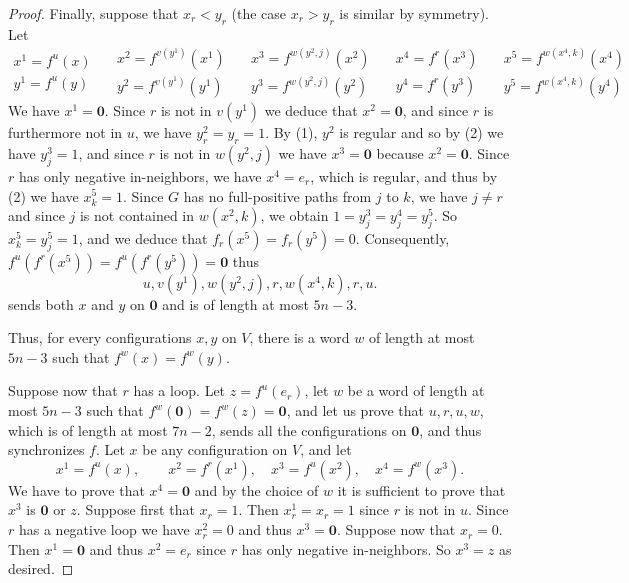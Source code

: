 \documentclass[11pt,letter]{article}
\newcommand{\ZERO}{{\mathbf{0}}}
\begin{document}
\begin{proof}
\medskip
Finally, suppose that $x_{r}<y_{r}$ (the case $x_{r}>y_{r}$ is similar by symmetry). Let 
\[
\begin{array}{l}
x^1=f^u(x)\\
y^1=f^u(y)
\end{array}
\quad
\begin{array}{l}
x^2=f^{v(y^1)}(x^1)\\
y^2=f^{v(y^1)}(y^1)
\end{array}
\quad
\begin{array}{l}
x^3=f^{w(y^2,j)}(x^2)\\
y^3=f^{w(y^2,j)}(y^2)
\end{array}
\quad
\begin{array}{l}
x^4=f^{r}(x^3)\\
y^4=f^{r}(y^3)
\end{array}
\quad
\begin{array}{l}
x^5=f^{w(x^4,k)}(x^4)\\
y^5=f^{w(x^4,k)}(y^4)
\end{array}
\]
We have $x^1=\ZERO$. Since $r$ is not in $v(y^1)$ we deduce that $x^2=\ZERO$, and since $r$ is furthermore not in $u$, we have $y^2_{r}=y_{r}=1$. By (1), $y^2$ is regular and so by (2) we have $y^3_j=1$, and since $r$ is not in $w(y^2,j)$ we have $x^3=\ZERO$ because $x^2=\ZERO$. Since $r$ has only negative in-neighbors, we have $x^4=e_{r}$, which is regular, and thus by (2) we have $x^5_k=1$. Since $G$ has no full-positive paths from $j$ to $k$, we have $j\neq r$ and since $j$ is not contained in $w(x^2,k)$, we obtain $1=y^3_j=y^4_j=y^5_j$. So $x^5_k=y^5_j=1$, and we deduce that $f_{r}(x^5)=f_{r}(y^5)=0$. Consequently, $f^u(f^{r}(x^5))=f^u(f^{r}(y^5))=\ZERO$ thus 
\[
u,v(y^1),w(y^2,j),r,w(x^4,k),r,u.
\]
sends both $x$ and $y$ on $\ZERO$ and is of length at most $5n-3$. 

\medskip
Thus, for every configurations $x,y$ on $V$, there is a word $w$ of length at most $5n-3$ such that $f^{w}(x)=f^{w}(y)$. 

\medskip
Suppose now that $r$ has a loop. Let $z=f^u(e_{r})$, let $w$ be a word of length at most $5n-3$ such that $f^{w}(\ZERO)=f^{w}(z)=\ZERO$, and let us prove that $u,r,u,w$, which is of length at most $7n-2$, sends all the configurations on $\ZERO$, and thus synchronizes $f$. Let $x$ be any configuration on $V$, and let
\[
x^1=f^u(x),\qquad x^2=f^{r}(x^1),\quad x^3=f^u(x^2),\quad x^4=f^w(x^3). 
\]
We have to prove that $x^4=\ZERO$ and by the choice of $w$ it is sufficient to prove that $x^3$ is $\ZERO$ or $z$. Suppose first that $x_{r}=1$. Then $x^1_{r}=x_{r}=1$ since $r$ is not in $u$. Since $r$ has a negative loop we have $x^2_{r}=0$  and thus $x^3=\ZERO$. Suppose now that $x_{r}=0$. Then $x^1=\ZERO$ and thus $x^2=e_{r}$ since $r$ has only negative in-neighbors. So $x^3=z$ as desired.
\end{proof}
\end{document}
